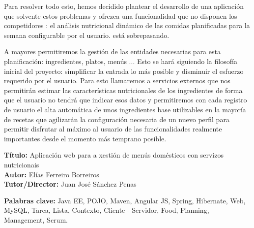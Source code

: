 \documentclass[12pt, a4paper, twoside]{book}
\begin{document}
	Para resolver todo esto, hemos decidido plantear el desarrollo de una aplicación que solvente estos problemas y ofrezca una funcionalidad que no disponen los competidores : el análisis nutricional dinámico de las comidas planificadas para la semana configurable por el usuario. está sobrepasando.

	A mayores permitiremos la gestión de las entidades necesarias para esta planificación: ingredientes, platos, menús ... 
	Esto se hará siguiendo la filosofía inicial del proyecto: simplificar la entrada lo más posible y disminuir el esfuerzo requerido por el usuario. 
	Para esto llamaremos a servicios externos que nos permitirán estimar las características nutricionales de los ingredientes de forma que el usuario no tendrá que indicar esos datos y permitiremos con cada registro de usuario el alta automática de unos ingredientes base utilizables en la mayoría de recetas que agilizarán la configuración necesaria de un nuevo perfil para permitir disfrutar al máximo al usuario de las funcionalidades realmente importantes desde el momento más temprano posible.
	
	\clearpage
	
	\textbf{Título:} Aplicación web para a xestión de menús domésticos con servizos nutricionais
	\\
	\textbf{Autor:} Elías Ferreiro Borreiros
	\\
	\textbf{Tutor/Director:} Juan José Sánchez Penas
	
	
	\textbf{Palabras clave:} Java EE, POJO, Maven, Angular JS, Spring, Hibernate, Web, MySQL, Tarea, Lista, Contexto, Cliente - Servidor, Food, Planning, Management, Scrum. 
	
	
	\renewcommand{\contentsname}{Índice de contenidos}
	\renewcommand{\listfigurename}{Índice de figuras}
	\renewcommand{\listtablename}{Índice de tablas}
	
	\tableofcontents %
	
	\listoffigures %
	
	\listoftables %
	
	\clearpage
	\raggedbottom
\end{document}
